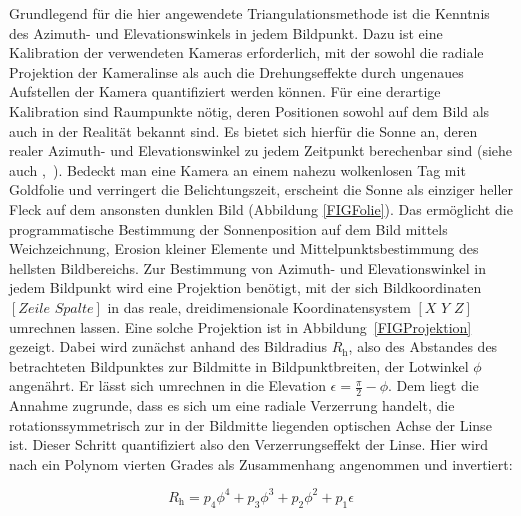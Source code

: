\documentclass[a4paper,11pt,twoside,german]{article}
\newcommand{\absatz}{\smallbreak} %
\begin{document}
Grundlegend für die hier angewendete Triangulationsmethode ist die Kenntnis des
Azimuth- und Elevationswinkels in jedem Bildpunkt. Dazu ist eine Kalibration der
verwendeten Kameras erforderlich, mit der sowohl die radiale Projektion der
Kameralinse als auch die Drehungseffekte durch ungenaues Aufstellen der Kamera
quantifiziert werden können. Für eine derartige Kalibration sind Raumpunkte
nötig, deren Positionen sowohl auf dem Bild als auch in der Realität bekannt
sind. Es bietet sich hierfür die Sonne an, deren realer Azimuth- und
Elevationswinkel zu jedem Zeitpunkt berechenbar sind (siehe auch
\mbox{\citeauthor{pysolar}, \citeyear{pysolar}}).
\absatz
Bedeckt man eine Kamera an einem nahezu wolkenlosen Tag mit Goldfolie und
verringert die Belichtungszeit, erscheint die Sonne als einziger heller Fleck
auf dem ansonsten dunklen Bild (Abbildung \ref{FIGFolie}).  Das ermöglicht die
programmatische Bestimmung der Sonnenposition auf dem Bild mittels Weichzeichnung,
Erosion kleiner Elemente und Mittelpunktsbestimmung des hellsten Bildbereichs.
\absatz
Zur Bestimmung von Azimuth- und Elevationswinkel in jedem Bildpunkt wird eine
Projektion benötigt, mit der sich Bildkoordinaten $\left[Zeile \,\,
Spalte\right]$ in das reale, dreidimensionale Koordinatensystem
$\left[X\,\,Y\,\,Z\right]$ umrechnen lassen. Eine solche Projektion ist
in Abbildung~\ref{FIGProjektion} gezeigt. Dabei wird zunächst anhand des
Bildradius $R_\mathrm{h}$, also des Abstandes des betrachteten Bildpunktes zur
Bildmitte in Bildpunktbreiten, der Lotwinkel $\phi$ angenährt. Er lässt sich
umrechnen in die Elevation $\epsilon = \frac{\pi}{2} - \phi$. Dem liegt die
Annahme zugrunde, dass es sich um eine radiale Verzerrung handelt, die
rotationssymmetrisch zur in der Bildmitte liegenden optischen Achse der Linse
ist.  Dieser Schritt quantifiziert also den Verzerrungseffekt der Linse. Hier
wird nach \cite{ingo} ein Polynom vierten Grades als Zusammenhang angenommen und
invertiert:

\begin{equation}
\label{GLRadial}
R_\mathrm{h} = p_4 \phi ^ 4 + p_3 \phi ^ 3 + p_2 \phi ^ 2 + p_1
\epsilon 
\end{equation}
\end{document}
